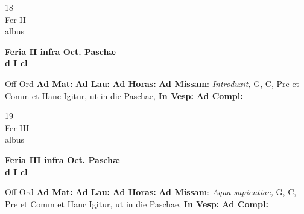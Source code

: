 \documentclass[10pt, openany]{book}
\begin{document}
        \begin{center}
            \begin{minipage}{3.5in}
                \vspace{2em}
                \begin{minipage}{0.5in}
                    {\Huge 18} \\
                    {\normalsize Fer II} \\
                    {\normalsize albus}
                \end{minipage}
                \begin{minipage}{3.0in}
                    \textbf{ \large Feria II infra Oct. Paschæ \\
                    \textnormal{\normalsize d I cl}} \\ 
                \end{minipage}
                \begin{justify}Off Ord
                    \textbf{Ad Mat: }
                    \textbf{Ad Lau: }
                    \textbf{Ad Horas: }\textbf{Ad Missam}: \textit{Introduxit,} G, C, Pre et Comm et Hanc Igitur, ut in die Paschae,  
                    \textbf{In Vesp: }
                    \textbf{Ad Compl: }
                \end{justify}
            \end{minipage}
        \end{center}
    
        \begin{center}
            \begin{minipage}{3.5in}
                \vspace{2em}
                \begin{minipage}{0.5in}
                    {\Huge 19} \\
                    {\normalsize Fer III} \\
                    {\normalsize albus}
                \end{minipage}
                \begin{minipage}{3.0in}
                    \textbf{ \large Feria III infra Oct. Paschæ \\
                    \textnormal{\normalsize d I cl}} \\ 
                \end{minipage}
                \begin{justify}Off Ord
                    \textbf{Ad Mat: }
                    \textbf{Ad Lau: }
                    \textbf{Ad Horas: }\textbf{Ad Missam}: \textit{Aqua sapientiae,} G, C, Pre et Comm et Hanc Igitur, ut in die Paschae,  
                    \textbf{In Vesp: }
                    \textbf{Ad Compl: }
                \end{justify}
            \end{minipage}
        \end{center}
    
\end{document}
